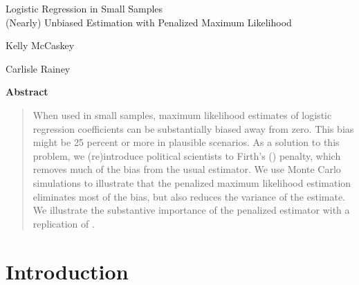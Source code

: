 \documentclass[12pt]{article}
\begin{document}
\begin{center}
{\Large Logistic Regression in Small Samples}\\\vspace{2mm}
{\large (Nearly) Unbiased Estimation with Penalized Maximum Likelihood}\\\vspace{2mm}

\vspace{10mm}

Kelly McCaskey

\vspace{3mm}

Carlisle Rainey
\end{center}

\vspace{10mm}

{\centerline{\textbf{Abstract}}}
\begin{quote}\noindent
When used in small samples, maximum likelihood estimates of logistic regression coefficients can be substantially biased away from zero. 
This bias might be 25 percent or more in plausible scenarios. 
As a solution to this problem, we (re)introduce political scientists to Firth's (\citeyear{Firth1993}) penalty, which removes much of the bias from the usual estimator. 
We use Monte Carlo simulations to illustrate that the penalized maximum likelihood estimation eliminates most of the bias, but also reduces the variance of the estimate. 
We illustrate the substantive importance of the penalized estimator with a replication of \cite{Weisiger2014}.
 \end{quote}

\thispagestyle{empty}

\newpage
\doublespace

\section*{Introduction}
\end{document}
